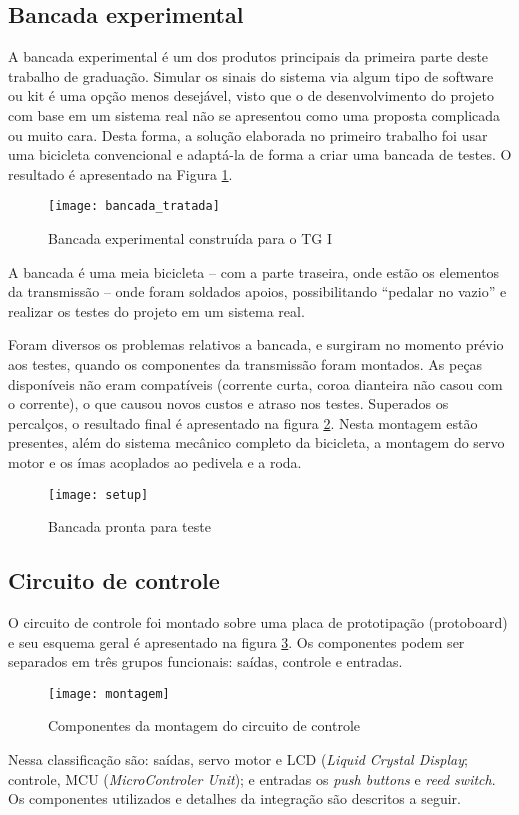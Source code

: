 \documentclass[a4paper,11pt]{article}
\begin{document}
\subsection{Bancada experimental}
\label{sec:bancada}
A bancada experimental é um dos produtos principais da primeira parte deste
trabalho de graduação. Simular os sinais do sistema via algum tipo de software
ou kit é uma opção menos desejável, visto que o de desenvolvimento
do projeto com base em um sistema real não se apresentou como uma proposta
complicada ou muito cara. Desta forma, a solução elaborada no primeiro trabalho
foi usar uma bicicleta convencional e adaptá-la de forma a criar uma bancada de
testes. O resultado é apresentado na Figura
\ref{fig:bancada}.
\begin{figure}[ht]
 \begin{center}
  \texttt{[image: bancada\_tratada]}
 \end{center}
 \caption{Bancada experimental construída para o TG I}
 \label{fig:bancada}
\end{figure}
A bancada é uma meia bicicleta -- com a parte traseira, onde estão os
elementos da transmissão  -- onde foram soldados apoios, possibilitando
``pedalar no vazio'' e realizar os testes do projeto em um sistema real.

Foram diversos os problemas relativos a bancada, e surgiram no momento prévio
aos testes, quando os componentes da transmissão foram montados. As peças
disponíveis não eram compatíveis (corrente curta, coroa dianteira
não casou com o corrente), o que causou novos custos e atraso nos testes.
Superados os percalços, o resultado final é apresentado na figura
\ref{fig:setup}. Nesta montagem estão presentes, além do sistema mecânico
completo da bicicleta, a montagem do servo motor e os ímas acoplados ao
pedivela e a roda.
\begin{figure}[h!]
\begin{center}
 \texttt{[image: setup]}
\end{center}
  \caption{Bancada pronta para teste}
  \label{fig:setup}
\end{figure}


%
\subsection{Circuito de controle}
\label{sec:montagem}
O circuito de controle foi montado sobre uma placa de prototipação (protoboard)
e seu esquema geral é apresentado na figura \ref{fig:montagem}.
Os componentes podem ser separados em três grupos funcionais: saídas, controle
e entradas.
\begin{figure}[ht]
\begin{center}
 \texttt{[image: montagem]}
\end{center}
  \caption{Componentes da montagem do circuito de controle}
  \label{fig:montagem}
\end{figure}
Nessa classificação são: saídas, servo motor e LCD (\textit{Liquid
Crystal Display}; controle, MCU (\textit{MicroControler Unit}); e entradas os
\textit{push buttons} e \textit{reed switch}. Os componentes utilizados e
detalhes da integração são descritos a seguir.
\end{document}
